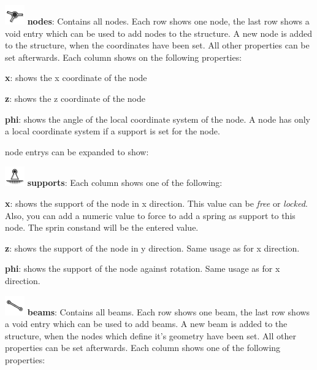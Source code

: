 \documentclass[a4paper,11pt]{report}
\begin{document}
\begin{trivlist}
	\item[] \includegraphics[scale = 0.5]{../../icons/node.png} \textbf{nodes}: Contains all nodes. Each row shows one node, the last row shows a void entry which can be used to add nodes to the structure. A new node is added to the structure, when the coordinates have been set. All other properties can be set afterwards. Each column shows on the following properties:
	\begin{trivlist}
		\leftskip=1cm
		\item[]\textbf{x}: shows the x coordinate of the node
		\item[]\textbf{z}: shows the z coordinate of the node
		\item[]\textbf{phi}: shows the angle of the local coordinate system of the node. A node has only a local coordinate system if a support is set for the node.
	\end{trivlist}
	node entrys can be expanded to show: 
	\begin{trivlist}
		\leftskip=1cm
		\item[] \includegraphics[scale = 0.5]{../../icons/bearing.png} \textbf{supports}: Each column shows one of the following:
		\begin{trivlist}
		\leftskip=2cm
		\item[]\textbf{x}: shows the support of the node in x direction. This value can be \textit{free} or \textit{locked}. Also, you can add a numeric value to force \colin to add a spring as support to this node. The sprin constand will be the entered value.
		\item[]\textbf{z}: shows the support of the node in y direction. Same usage as for x direction.
		\item[]\textbf{phi}: shows the support of the node against rotation. Same usage as for x direction.
		\end{trivlist}
	\end{trivlist}
	\item[] \includegraphics[scale = 0.5]{../../icons/beam.png} \textbf{beams}: Contains all beams. Each row shows one beam, the last row shows a void entry which can be used to add beams. A new beam is added to the structure, when the nodes which define it's geometry have been set. All other properties can be set afterwards. Each column shows one of the following properties:

\end{trivlist}
\end{document}
